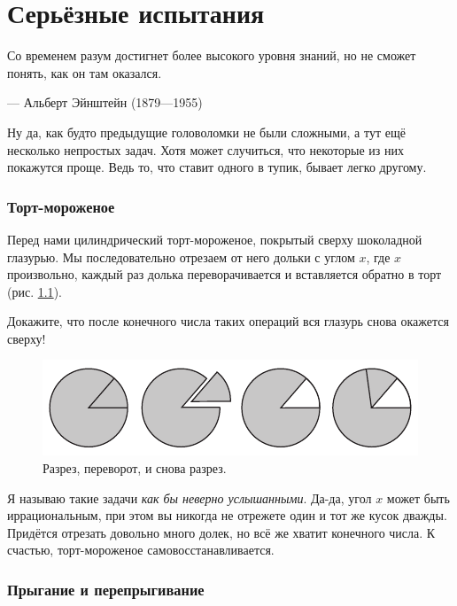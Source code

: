 \chapter{Серьёзные испытания}


\setlength{\epigraphwidth}{.70\textwidth}
\epigraph{Со временем разум достигнет более высокого уровня знаний, но не сможет понять, как он там оказался.
}{--- Альберт Эйнштейн (1879---1955)}

Ну да, как будто предыдущие головоломки не были сложными, а тут ещё несколько непростых задач.
Хотя может случиться, что некоторые из них покажутся проще.
Ведь то, что ставит одного в тупик, бывает легко другому.


\subsection*{Торт-мороженое}\label{Торт-мороженое}

Перед нами цилиндрический торт-мороженое, покрытый сверху шоколадной глазурью.
Мы последовательно отрезаем от него дольки с углом $x$, где $x$ произвольно,
каждый раз долька переворачивается и вставляется обратно в торт
(рис. \ref{pic:tort}).

Докажите, что после конечного числа таких операций вся глазурь снова окажется сверху!


\begin{figure}[htb!]
\centering
\includegraphics[scale=1]{pics/tort}
\caption{Разрез, переворот, и снова разрез.}
\label{pic:tort}
\end{figure}

Я называю такие задачи \emph{как бы неверно услышанными}.
Да-да, угол $x$ может быть иррациональным, 
при этом вы никогда не отрежете один и тот же кусок дважды.
Придётся отрезать довольно много долек, но всё же хватит конечного числа.
К счастью, торт-мороженое самовосстанавливается.

\subsection*{Прыгание и перепрыгивание}

